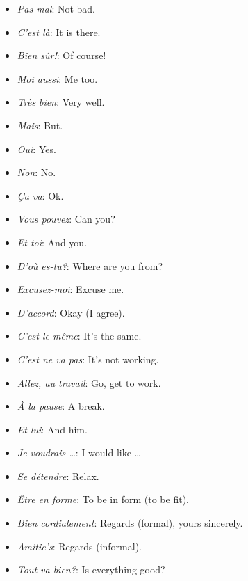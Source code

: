 \begin{itemize}
\item{\emph{Pas mal}: Not bad.}

\item{\emph{C'est l\`a}: It is there.}

\item{\emph{Bien s\^ur!}: Of course!}

\item{\emph{Moi aussi}: Me too.}

\item{\emph{Tr\`es bien}: Very well.}

\item{\emph{Mais}: But.}

\item{\emph{Oui}: Yes.}

\item{\emph{Non}: No.}

\item{\emph{\c{C}a va}: Ok.}

\item{\emph{Vous pouvez}: Can you?}

\item{\emph{Et toi}: And you.}

\item{\emph{D'o\`u es-tu?}: Where are you from?}

\item{\emph{Excusez-moi}: Excuse me.}

\item{\emph{D'accord}: Okay (I agree).}

\item{\emph{C'est le m\^eme}: It's the same.}

\item{\emph{C'est ne va pas}: It's not working.}

\item{\emph{Allez, au travail}: Go, get to work.}

\item{\emph{\`A la pause}: A break.}

\item{\emph{Et lui}: And him.}

\item{\emph{Je voudrais \dots}: I would like \dots}

\item{\emph{Se d\'etendre}: Relax.}

\item{\emph{\^Etre en forme}: To be in form (to be fit).}

\item{\emph{Bien cordialement}: Regards (formal), yours sincerely.}

\item{\emph{Amitie's}: Regards (informal).}

\item{\emph{Tout va bien?}: Is everything good?}


\end{itemize}
